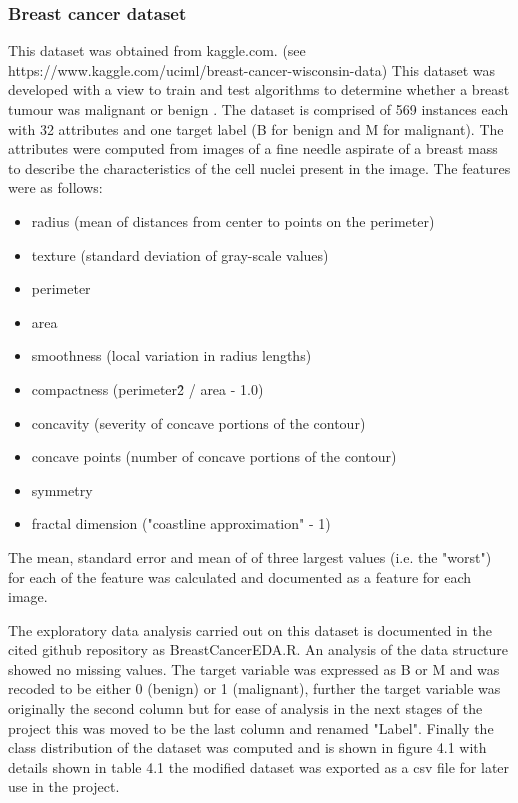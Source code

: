 \subsubsection{Breast cancer dataset}
This dataset was obtained from kaggle.com. \newline
(see https://www.kaggle.com/uciml/breast-cancer-wisconsin-data) \newline
This dataset was developed with a view to train and test algorithms to determine whether a breast tumour was malignant or benign \cite{}. \newline
The dataset is comprised of 569 instances each with 32 attributes and one target label (B for benign and M for malignant).\newline
The attributes were computed from images of a fine needle aspirate of a breast mass to describe the characteristics of the cell nuclei present in the image. The features were as follows:
\begin{itemize}
    \item radius (mean of distances from center to points on the perimeter)
    \item texture (standard deviation of gray-scale values) 
    \item perimeter 
    \item area 
    \item smoothness (local variation in radius lengths) 
    \item compactness (perimeter\^2 / area - 1.0)
    \item concavity (severity of concave portions of the contour)
    \item concave points (number of concave portions of the contour)
    \item symmetry
    \item fractal dimension ("coastline approximation" - 1)
\end{itemize}
The mean, standard error and mean of of three largest values (i.e. the "worst") for each of the feature was calculated and documented as a feature for each image.\newline

The exploratory data analysis carried out on this dataset is documented in the cited github repository as BreastCancerEDA.R.\newline
An analysis of the data structure showed no missing values. The target variable was expressed as B or M and was recoded to be either 0 (benign) or 1 (malignant), further the target variable was originally the second column but for ease of analysis in the next stages of the project this was moved to be the last column and renamed "Label".
Finally the class distribution of the dataset was computed and is shown in figure 4.1 with details shown in table 4.1 the modified dataset was exported as a csv file for later use in the project.\newline



